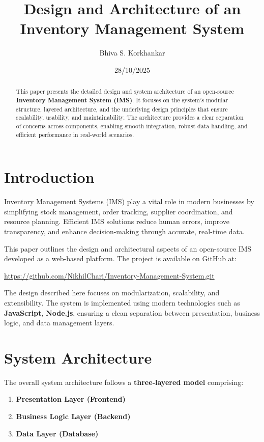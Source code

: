 \documentclass[12pt,a4paper]{article}
\title{\textbf{Design and Architecture of an Inventory Management System}}
\author{Bhiva S. Korkhankar}
\date{28/10/2025}
\begin{document}
\maketitle

\begin{abstract}
This paper presents the detailed design and system architecture of an open-source \textbf{Inventory Management System (IMS)}. It focuses on the system’s modular structure, layered architecture, and the underlying design principles that ensure scalability, usability, and maintainability. The architecture provides a clear separation of concerns across components, enabling smooth integration, robust data handling, and efficient performance in real-world scenarios.
\end{abstract}

\section{Introduction}
Inventory Management Systems (IMS) play a vital role in modern businesses by simplifying stock management, order tracking, supplier coordination, and resource planning. Efficient IMS solutions reduce human errors, improve transparency, and enhance decision-making through accurate, real-time data.

This paper outlines the design and architectural aspects of an open-source IMS developed as a web-based platform. The project is available on GitHub at:

\begin{center}
\href{https://github.com/NikhilChari/Inventory-Management-System.git}{https://github.com/NikhilChari/Inventory-Management-System.git}
\end{center}

The design described here focuses on modularization, scalability, and extensibility. The system is implemented using modern technologies such as \textbf{JavaScript}, \textbf{Node.js}, ensuring a clean separation between presentation, business logic, and data management layers.

\section{System Architecture}
The overall system architecture follows a \textbf{three-layered model} comprising:
\begin{enumerate}
    \item \textbf{Presentation Layer (Frontend)}
    \item \textbf{Business Logic Layer (Backend)}
    \item \textbf{Data Layer (Database)}
\end{enumerate}
\end{document}
